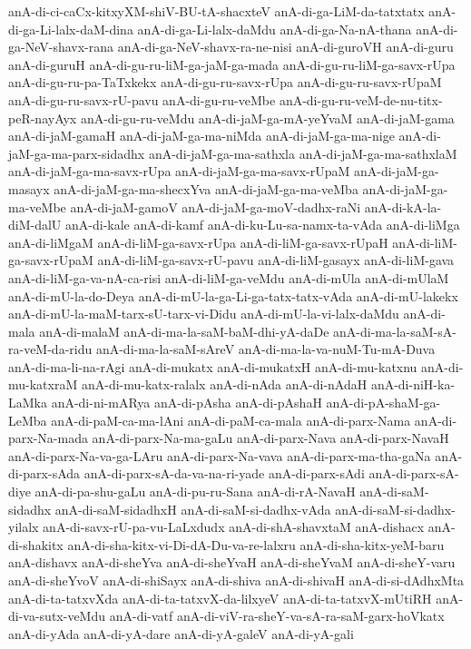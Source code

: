 {anA-di-ci-caCx-kitxyXM-shiV-BU-tA-shacxteV
anA-di-ga-LiM-da-tatxtatx
anA-di-ga-Li-lalx-daM-dina
anA-di-ga-Li-lalx-daMdu
anA-di-ga-Na-nA-thana
anA-di-ga-NeV-shavx-rana
anA-di-ga-NeV-shavx-ra-ne-nisi
anA-di-guroVH
anA-di-guru
anA-di-guruH
anA-di-gu-ru-liM-ga-jaM-ga-mada
anA-di-gu-ru-liM-ga-savx-rUpa
anA-di-gu-ru-pa-TaTxkekx
anA-di-gu-ru-savx-rUpa
anA-di-gu-ru-savx-rUpaM
anA-di-gu-ru-savx-rU-pavu
anA-di-gu-ru-veMbe
anA-di-gu-ru-veM-de-nu-titx-peR-nayAyx
anA-di-gu-ru-veMdu
anA-di-jaM-ga-mA-yeYvaM
anA-di-jaM-gama
anA-di-jaM-gamaH
anA-di-jaM-ga-ma-niMda
anA-di-jaM-ga-ma-nige
anA-di-jaM-ga-ma-parx-sidadhx
anA-di-jaM-ga-ma-sathxla
anA-di-jaM-ga-ma-sathxlaM
anA-di-jaM-ga-ma-savx-rUpa
anA-di-jaM-ga-ma-savx-rUpaM
anA-di-jaM-ga-masayx
anA-di-jaM-ga-ma-shecxYva
anA-di-jaM-ga-ma-veMba
anA-di-jaM-ga-ma-veMbe
anA-di-jaM-gamoV
anA-di-jaM-ga-moV-dadhx-raNi
anA-di-kA-la-diM-dalU
anA-di-kale
anA-di-kamf
anA-di-ku-Lu-sa-namx-ta-vAda
anA-di-liMga
anA-di-liMgaM
anA-di-liM-ga-savx-rUpa
anA-di-liM-ga-savx-rUpaH
anA-di-liM-ga-savx-rUpaM
anA-di-liM-ga-savx-rU-pavu
anA-di-liM-gasayx
anA-di-liM-gava
anA-di-liM-ga-va-nA-ca-risi
anA-di-liM-ga-veMdu
anA-di-mUla
anA-di-mUlaM
anA-di-mU-la-do-Deya
anA-di-mU-la-ga-Li-ga-tatx-tatx-vAda
anA-di-mU-lakekx
anA-di-mU-la-maM-tarx-sU-tarx-vi-Didu
anA-di-mU-la-vi-lalx-daMdu
anA-di-mala
anA-di-malaM
anA-di-ma-la-saM-baM-dhi-yA-daDe
anA-di-ma-la-saM-sA-ra-veM-da-ridu
anA-di-ma-la-saM-sAreV
anA-di-ma-la-va-nuM-Tu-mA-Duva
anA-di-ma-li-na-rAgi
anA-di-mukatx
anA-di-mukatxH
anA-di-mu-katxnu
anA-di-mu-katxraM
anA-di-mu-katx-ralalx
anA-di-nAda
anA-di-nAdaH
anA-di-niH-ka-LaMka
anA-di-ni-mARya
anA-di-pAsha
anA-di-pAshaH
anA-di-pA-shaM-ga-LeMba
anA-di-paM-ca-ma-lAni
anA-di-paM-ca-mala
anA-di-parx-Nama
anA-di-parx-Na-mada
anA-di-parx-Na-ma-gaLu
anA-di-parx-Nava
anA-di-parx-NavaH
anA-di-parx-Na-va-ga-LAru
anA-di-parx-Na-vava
anA-di-parx-ma-tha-gaNa
anA-di-parx-sAda
anA-di-parx-sA-da-va-na-ri-yade
anA-di-parx-sAdi
anA-di-parx-sA-diye
anA-di-pa-shu-gaLu
anA-di-pu-ru-Sana
anA-di-rA-NavaH
anA-di-saM-sidadhx
anA-di-saM-sidadhxH
anA-di-saM-si-dadhx-vAda
anA-di-saM-si-dadhx-yilalx
anA-di-savx-rU-pa-vu-LaLxdudx
anA-di-shA-shavxtaM
anA-dishacx
anA-di-shakitx
anA-di-sha-kitx-vi-Di-dA-Du-va-re-lalxru
anA-di-sha-kitx-yeM-baru
anA-dishavx
anA-di-sheYva
anA-di-sheYvaH
anA-di-sheYvaM
anA-di-sheY-varu
anA-di-sheYvoV
anA-di-shiSayx
anA-di-shiva
anA-di-shivaH
anA-di-si-dAdhxMta
anA-di-ta-tatxvXda
anA-di-ta-tatxvX-da-lilxyeV
anA-di-ta-tatxvX-mUtiRH
anA-di-va-sutx-veMdu
anA-di-vatf
anA-di-viV-ra-sheY-va-sA-ra-saM-garx-hoVkatx
anA-di-yAda
anA-di-yA-dare
anA-di-yA-galeV
anA-di-yA-gali
}
